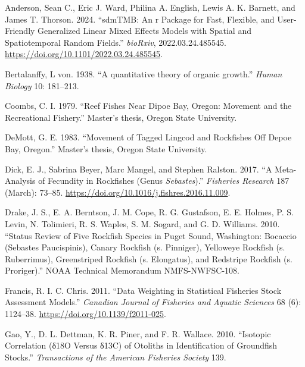 \documentclass[
]{scrartcl}
\newlength{\cslhangindent}
\newenvironment{CSLReferences}[2] %
 {\begin{list}{}{%
  \setlength{\itemindent}{0pt}
  \setlength{\leftmargin}{0pt}
  \setlength{\parsep}{0pt}
  \ifodd #1
   \setlength{\leftmargin}{\cslhangindent}
   \setlength{\itemindent}{-1\cslhangindent}
  \fi
  \setlength{\itemsep}{#2\baselineskip}}}
 {\end{list}}
\begin{document}
\label{refs}
\begin{CSLReferences}{1}{0}
Anderson, Sean C., Eric J. Ward, Philina A. English, Lewis A. K.
Barnett, and James T. Thorson. 2024. {``sdmTMB: An r Package for Fast,
Flexible, and User-Friendly Generalized Linear Mixed Effects Models with
Spatial and Spatiotemporal Random Fields.''} \emph{bioRxiv},
2022.03.24.485545. \url{https://doi.org/10.1101/2022.03.24.485545}.

Bertalanffy, L von. 1938. {``{A quantitative theory of organic
growth}.''} \emph{Human Biology} 10: 181--213.

Coombs, C. I. 1979. {``Reef Fishes Near Dipoe Bay, Oregon: Movement and
the Recreational Fishery.''} Master's thesis, Oregon State University.

DeMott, G. E. 1983. {``Movement of Tagged Lingcod and Rockfishes Off
Depoe Bay, Oregon.''} Master's thesis, Oregon State University.

Dick, E. J., Sabrina Beyer, Marc Mangel, and Stephen Ralston. 2017. {``A
Meta-Analysis of Fecundity in Rockfishes (Genus \emph{Sebastes}).''}
\emph{Fisheries Research} 187 (March): 73--85.
\url{https://doi.org/10.1016/j.fishres.2016.11.009}.

Drake, J. S., E. A. Berntson, J. M. Cope, R. G. Gustafson, E. E. Holmes,
P. S. Levin, N. Tolimieri, R. S. Waples, S. M. Sogard, and G. D.
Williams. 2010. {``Status Review of Five Rockfish Species in Puget
Sound, Washington: Bocaccio (Sebastes Paucispinis), Canary Rockfish (s.
Pinniger), Yelloweye Rockfish (s. Ruberrimus), Greenstriped Rockfish (s.
Elongatus), and Redstripe Rockfish (s. Proriger).''} NOAA Technical
Memorandum NMFS-NWFSC-108.

Francis, R. I. C. Chris. 2011. {``Data Weighting in Statistical
Fisheries Stock Assessment Models.''} \emph{Canadian Journal of
Fisheries and Aquatic Sciences} 68 (6): 1124--38.
\url{https://doi.org/10.1139/f2011-025}.

Gao, Y., D. L. Dettman, K. R. Piner, and F. R. Wallace. 2010.
{``Isotopic Correlation (δ18O Versus δ13C) of Otoliths in Identification
of Groundfish Stocks.''} \emph{Transactions of the American Fisheries
Society} 139.


\end{CSLReferences}
\end{document}
